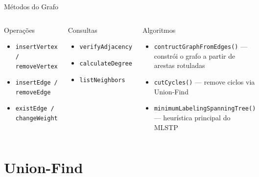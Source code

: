 \documentclass{beamer}
\begin{document}

\begin{frame}{Métodos do Grafo}

\begin{columns}[T]

    \begin{block}{Operações}
        \begin{itemize}
            \item \texttt{insertVertex / removeVertex}
            \item \texttt{insertEdge / removeEdge}
            \item \texttt{existEdge / changeWeight}
        \end{itemize}
    \end{block}

    \vspace{0.2cm}

    \begin{block}{Consultas}
        \begin{itemize}
            \item \texttt{verifyAdjacency}
            \item \texttt{calculateDegree}
            \item \texttt{listNeighbors}
        \end{itemize}
    \end{block}

    \begin{block}{Algoritmos}
        \begin{itemize}
            \item \texttt{contructGraphFromEdges()} — constrói o grafo a partir de arestas rotuladas
            \item \texttt{cutCycles()} — remove ciclos via Union-Find
            \item \texttt{minimumLabelingSpanningTree()} — heurística principal do MLSTP
        \end{itemize}
    \end{block}

\end{columns}

\end{frame}

\section{Union-Find}
\end{document}
